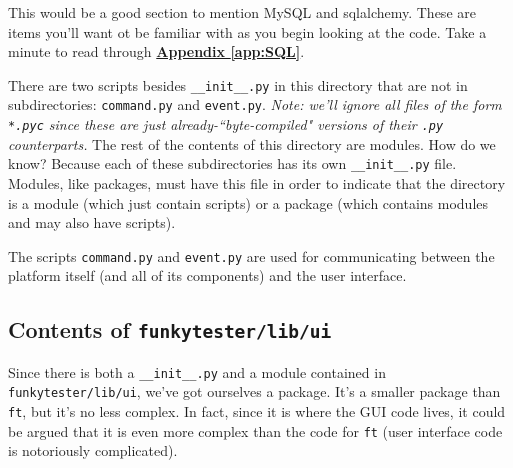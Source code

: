 \documentclass{report}
\begin{document}
This would be a good section to mention MySQL and sqlalchemy. These are items you'll want ot be familiar with as you begin looking at the code. Take a minute to read through \hyperref[app:SQL]{\textbf{Appendix \ref{app:SQL}}}. \\

	\begin{minipage}{\linewidth}
		\label{fig:lib/ft}
	\end{minipage}
		\vspace{5pt}%

There are two scripts  besides \texttt{\_\_init\_\_.py} in this directory that are not in subdirectories: \texttt{command.py} and \texttt{event.py}. \textit{Note: we'll ignore all files of the form \texttt{*.pyc} since these are just already-``byte-compiled" versions of their \texttt{.py} counterparts.} The rest of the contents of this directory are modules. How do we know? Because each of these subdirectories has its own \texttt{\_\_init\_\_.py} file. Modules, like packages, must have this file in order to indicate that the directory is a module (which just contain scripts) or a package (which contains modules and may also have scripts).

The scripts \texttt{command.py} and \texttt{event.py} are used for communicating between the platform itself (and all of its components) and the user interface.

\subsection{Contents of \texttt{funkytester/lib/ui}} \label{sec:ui_contents}
Since there is both a \texttt{\_\_init\_\_.py} and a module contained in \texttt{funkytester/lib/ui}, we've got ourselves a package. It's a smaller package than \texttt{ft}, but it's no less complex. In fact, since it is where the GUI code lives, it could be argued that it is even more complex than the code for \texttt{ft} (user interface code is notoriously complicated).
\end{document}
